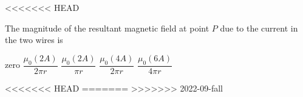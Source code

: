 \documentclass{../../oss-apphys-exam}
\begin{document}
\begin{multicols*}{2}
\begin{questions}
<<<<<<< HEAD
    
    \question The magnitude of the resultant magnetic field at point $P$ due to
    the current in the two wires is
    \begin{choices}
      \choice zero
      \choice$\dfrac{\mu_0(2A)}{2\pi r}$
      \choice$\dfrac{\mu_0(2A)}{\pi r}$
      \choice$\dfrac{\mu_0(4A)}{2\pi r}$
      \choice$\dfrac{\mu_0(6A)}{4\pi r}$
    \end{choices}
    \label{q:2wires2}

<<<<<<< HEAD
=======
%    
>>>>>>> 2022-09-fall


\end{questions}
\end{multicols*}
\end{document}
